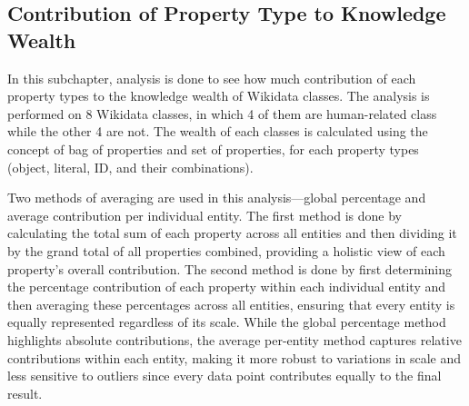 \subsection{Contribution of Property Type to Knowledge Wealth} \label{wealth & proptype contribution}

In this subchapter, analysis is done to see how much contribution of each property types to the knowledge wealth of Wikidata classes. The analysis is performed on 8 Wikidata classes, in which 4 of them are human-related class while the other 4 are not. The wealth of each classes is calculated using the concept of bag of properties and set of properties, for each property types (object, literal, ID, and their combinations).

Two methods of averaging are used in this analysis—global percentage and average contribution per individual entity. The first method is done by calculating the total sum of each property across all entities and then dividing it by the grand total of all properties combined, providing a holistic view of each property's overall contribution. The second method is done by first determining the percentage contribution of each property within each individual entity and then averaging these percentages across all entities, ensuring that every entity is equally represented regardless of its scale. While the global percentage method highlights absolute contributions, the average per-entity method captures relative contributions within each entity, making it more robust to variations in scale and less sensitive to outliers since every data point contributes equally to the final result.

    
